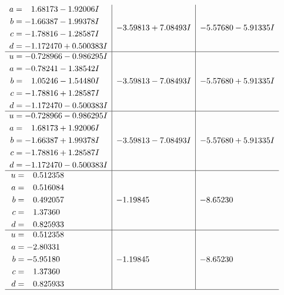 \documentclass[1p]{elsarticle_modified}
\theoremstyle{definition}
\begin{document}
$$\begin{array}{c|c|c}
\begin{aligned}
a &= \phantom{-}1.68173 - 1.92006 I \\
b &= -1.66387 - 1.99378 I \\
c &= -1.78816 - 1.28587 I \\
d &= -1.172470 + 0.500383 I\end{aligned}
 & -3.59813 + 7.08493 I & -5.57680 - 5.91335 I \\ \hline\begin{aligned}
u &= -0.728966 - 0.986295 I \\
a &= -0.78241 - 1.38542 I \\
b &= \phantom{-}1.05246 - 1.54480 I \\
c &= -1.78816 + 1.28587 I \\
d &= -1.172470 - 0.500383 I\end{aligned}
 & -3.59813 - 7.08493 I & -5.57680 + 5.91335 I \\ \hline\begin{aligned}
u &= -0.728966 - 0.986295 I \\
a &= \phantom{-}1.68173 + 1.92006 I \\
b &= -1.66387 + 1.99378 I \\
c &= -1.78816 + 1.28587 I \\
d &= -1.172470 - 0.500383 I\end{aligned}
 & -3.59813 - 7.08493 I & -5.57680 + 5.91335 I \\ \hline\begin{aligned}
u &= \phantom{-}0.512358\phantom{ +0.000000I} \\
a &= \phantom{-}0.516084\phantom{ +0.000000I} \\
b &= \phantom{-}0.492057\phantom{ +0.000000I} \\
c &= \phantom{-}1.37360\phantom{ +0.000000I} \\
d &= \phantom{-}0.825933\phantom{ +0.000000I}\end{aligned}
 & -1.19845\phantom{ +0.000000I} & -8.65230\phantom{ +0.000000I} \\ \hline\begin{aligned}
u &= \phantom{-}0.512358\phantom{ +0.000000I} \\
a &= -2.80331\phantom{ +0.000000I} \\
b &= -5.95180\phantom{ +0.000000I} \\
c &= \phantom{-}1.37360\phantom{ +0.000000I} \\
d &= \phantom{-}0.825933\phantom{ +0.000000I}\end{aligned}
 & -1.19845\phantom{ +0.000000I} & -8.65230\phantom{ +0.000000I}\\
 \hline 
 \end{array}$$\newpage\newpage\renewcommand{\arraystretch}{1}
\end{document}
